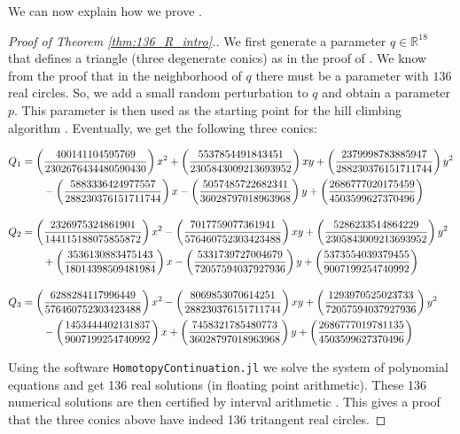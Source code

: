 \documentclass[12pt]{amsart}
\theoremstyle{definition}
\theoremstyle{definition}
\numberwithin{equation}{section}
\begin{document}
We can now explain how we prove .
\begin{proof}[Proof of Theorem \ref{thm:136_R_intro}.]
We first generate a parameter $q\in\mathbb R^{18}$ that defines a triangle (three degenerate conics) as in the proof of . We know from the proof that in the neighborhood of $q$ there must be a parameter with $136$ real circles. So, we add a small random perturbation to $q$ and obtain a parameter $p$. This parameter is then used as the starting point for the hill climbing algorithm . Eventually, we get the following three conics: 
\smallskip

{\footnotesize
\begin{align*}
    Q_{1}& = \left(\frac{400141104595769}{2302676434480590430}\right) x^{2} + \left(\frac{5537854491843451}{2305843009213693952}\right) xy + \left(\frac{2379998783885947}{288230376151711744}\right) y^{2}\\
    & \hspace{0.7cm} - \left(\frac{ 5883336424977557}{288230376151711744}\right) x - \left(\frac{5057485722682341}{36028797018963968}\right) y + \left(\frac{2686777020175459}{4503599627370496}\right) \\[1em]
    Q_{2} &= \left(\frac{2326975324861901}{144115188075855872}\right)x^2 - \left(\frac{7017759077361941}{576460752303423488}\right)xy + \left(\frac{5286233514864229}{2305843009213693952}\right)y^{2} \\
    & \hspace{0.7cm} + \left(\frac{3536130883475143}{18014398509481984}\right) x - \left(\frac{5331739727004679}{72057594037927936}\right) y + \left(\frac{5373554039379455}{9007199254740992}\right) \\[1em]
    Q_{3} &= \left(\frac{6288284117996449}{576460752303423488}\right) x^{2} - \left(\frac{8069853070614251}{288230376151711744}\right)xy + \left(\frac{1293970525023733}{72057594037927936}\right)y^{2}\\
    & \hspace{0.7cm} - \left(\frac{1453444402131837}{9007199254740992}\right)x + \left(\frac{7458321785480773}{36028797018963968}\right) y + \left(\frac{2686777019781135}{4503599627370496}\right)
\end{align*}}
\smallskip

Using the software \texttt{HomotopyContinuation.jl} \cite{HomotopyContinuation} we solve the system of polynomial equations  and get 136 real solutions (in floating point arithmetic). These 136 numerical solutions are then certified by interval arithmetic \cite{Certifying,HomotopyContinuation}. This gives a proof that the three conics above have indeed 136 tritangent real circles.
\end{proof}
\end{document}
